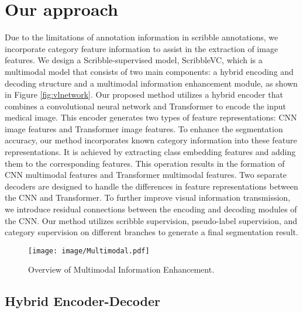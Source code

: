 \documentclass[sigconf,natbib=false]{acmart}
\begin{document}
\section{Our approach}
Due to the limitations of annotation information in scribble annotations, we incorporate category feature information to assist in the extraction of image features. We design a Scribble-supervised model, ScribbleVC,  which is a multimodal model that consists of two main components: a hybrid encoding and decoding structure and a multimodal information enhancement module, as shown in Figure \ref{fig:vlnetwork}. 
Our proposed method utilizes a hybrid encoder that combines a convolutional neural network and Transformer to encode the input medical image. This encoder generates two types of feature representations: CNN image features and Transformer image features. To enhance the segmentation accuracy, our method incorporates known category information into these feature representations. It is achieved by extracting class embedding features and adding them to the corresponding features. This operation results in the formation of CNN multimodal features and Transformer multimodal features. Two separate decoders are designed to handle the differences in feature representations between the CNN and Transformer. To further improve visual information transmission, we introduce residual connections between the encoding and decoding modules of the CNN. Our method utilizes scribble supervision, pseudo-label supervision, and category supervision on different branches to generate a final segmentation result.
\begin{figure*}[!ht]
\setlength{\abovecaptionskip}{-1mm}
  \centering
  \texttt{[image: image/Multimodal.pdf]}
  \caption{Overview of Multimodal Information Enhancement.}
  \vspace{-4mm}
\end{figure*}
\vspace{-2mm}
\subsection{Hybrid Encoder-Decoder}
\end{document}
